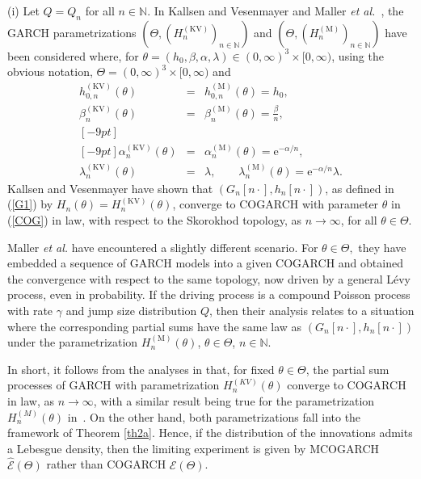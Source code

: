 \documentclass[number,citesort,seceqn,dvips]{arxbj}
\newcommand{\eqref}[1]{(\ref{#1})}
\newcommand{\NN}{\mathbb{N}}
\newcommand{\EEE}{{\mathcal E}}
\begin{document}
\begin{remark} \label{KVMMS}
(i) Let $Q=Q_n$ for all $n\in\NN$.
In Kallsen and Vesenmayer \cite{KV07} and Maller \textit{et al.}~\cite{MMS08},
the GARCH parametrizations $(\Theta,(H^{\mathrm{(KV)}}_n)_{n\in\NN})$ and
$(\Theta,(H^{\mathrm{(M)}}_n)_{n\in\NN})$ have been considered where, for
$\theta=(h_0,\beta,\alpha,\lambda)\in(0,\infty)^3\times[0,\infty)$,
using the obvious notation, $\Theta=(0,\infty)^3\times[0,\infty)$ and
%
\begin{eqnarray}\label{KVM}
h^{\mathrm{(KV)}}_{0,n}(\theta)&=&h^{\mathrm{(M)}}_{0,n}(\theta)=h_0 , \nonumber\\[-2pt]
\beta^{\mathrm{(KV)}}_n(\theta)&=&\beta^{\mathrm{(M)}}_n(\theta)=\frac\beta n
,\nonumber\\ [-9pt]\\ [-9pt]
\alpha^{\mathrm{(KV)}}_n(\theta)&=&\alpha^{\mathrm{(M)}}_n(\theta
)=\mathrm{e}^{-\alpha/n} ,\nonumber\\[-2pt]
\nonumber\lambda^{\mathrm{(KV)}}_n(\theta)&=&\lambda,\qquad
\lambda^{\mathrm{(M)}}_n(\theta) = \mathrm{e}^{-\alpha/n}\lambda .\nonumber
\end{eqnarray}
%
Kallsen and Vesenmayer \cite{KV07} have shown that
$(G_n[n\cdot],h_n[n\cdot])$, as defined in \eqref{G1} by
$H_n(\theta)=H^{\mathrm{(KV)}}_n(\theta)$, converge to COGARCH with parameter
$\theta$ in \eqref{COG} in law, with respect to the Skorokhod topology,
as $n\to\infty$, for all $\theta\in\Theta$.

Maller \textit{et al.} \cite{MMS08} have encountered a slightly different
scenario. For $\theta\in\Theta,$ they have embedded a sequence of GARCH
models into a given COGARCH and obtained the convergence with respect
to the same topology, now driven by a general L\'{e}vy process, even in
probability. If the driving process is a compound Poisson process with
rate $\gamma$ and jump size distribution $Q$, then their analysis
relates to a situation where the corresponding partial sums have the
same law as $(G_n[n\cdot],h_n[n\cdot])$ under the parametrization
$H^{\mathrm{(M)}}_n(\theta)$, $\theta\in\Theta$, $n\in\NN$.

In short, it follows from the analyses in \cite{KV07} that, for fixed
$\theta\in\Theta$, the partial sum
processes of GARCH with parametrization $H^{(KV)}_n(\theta)$ converge to
COGARCH in law, as
$n\to\infty$, with a similar result being true for the parametrization
$H^{(M)}_n(\theta)$ in~\cite{MMS08}. On the other hand,
both parametrizations fall into the framework of Theorem \ref{th2a}.
Hence, if the distribution of the innovations admits a Lebesgue
density, then the limiting experiment is given by MCOGARCH $\widehat
\EEE(\Theta)$ rather than COGARCH
$\EEE(\Theta)$.\vadjust{\goodbreak}


\end{remark}
\end{document}
